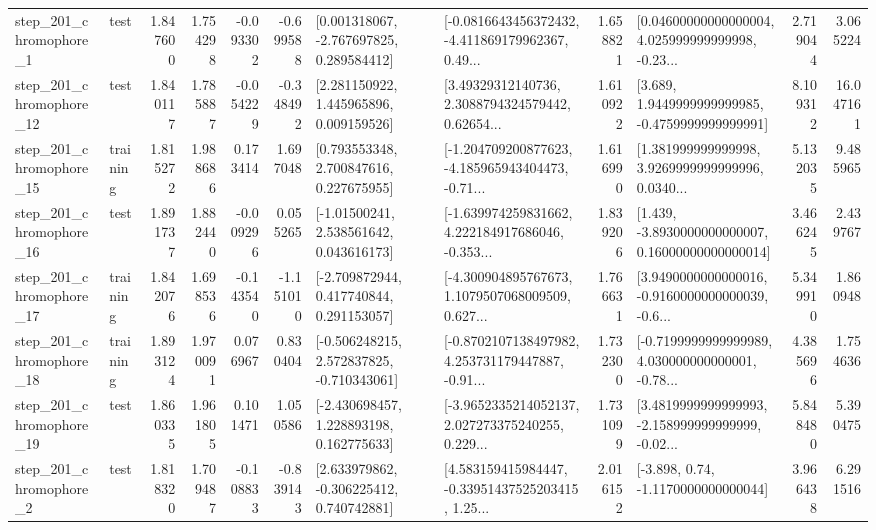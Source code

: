 \begin{tabular}{llrrrrllrlrr}
   step\_201\_chromophore\_1 &      test &      1.847600 &    1.754298 &     -0.093302 & -0.699588 &    [0.001318067, -2.767697825, 0.289584412] &  [-0.0816643456372432, -4.411869179962367, 0.49... &       1.658821 &  [0.04600000000000004, 4.025999999999998, -0.23... &            2.719044 &          3.065224 \\
  step\_201\_chromophore\_12 &      test &      1.840117 &    1.785887 &     -0.054229 & -0.348492 &     [2.281150922, 1.445965896, 0.009159526] &  [3.49329312140736, 2.3088794324579442, 0.62654... &       1.610922 &   [3.689, 1.9449999999999985, -0.4759999999999991] &            8.109312 &         16.047161 \\
  step\_201\_chromophore\_15 &  training &      1.815272 &    1.988686 &      0.173414 &  1.697048 &     [0.793553348, 2.700847616, 0.227675955] &  [-1.204709200877623, -4.185965943404473, -0.71... &       1.616990 &  [1.381999999999998, 3.9269999999999996, 0.0340... &            5.132035 &          9.485965 \\
  step\_201\_chromophore\_16 &      test &      1.891737 &    1.882440 &     -0.009296 &  0.055265 &     [-1.01500241, 2.538561642, 0.043616173] &  [-1.639974259831662, 4.222184917686046, -0.353... &       1.839206 &  [1.439, -3.8930000000000007, 0.16000000000000014] &            3.466245 &          2.439767 \\
  step\_201\_chromophore\_17 &  training &      1.842076 &    1.698536 &     -0.143540 & -1.151010 &    [-2.709872944, 0.417740844, 0.291153057] &  [-4.300904895767673, 1.1079507068009509, 0.627... &       1.766631 &  [3.9490000000000016, -0.9160000000000039, -0.6... &            5.349910 &          1.860948 \\
  step\_201\_chromophore\_18 &  training &      1.893124 &    1.970091 &      0.076967 &  0.830404 &   [-0.506248215, 2.572837825, -0.710343061] &  [-0.8702107138497982, 4.253731179447887, -0.91... &       1.732300 &  [-0.7199999999999989, 4.030000000000001, -0.78... &            4.385696 &          1.754636 \\
  step\_201\_chromophore\_19 &      test &      1.860335 &    1.961805 &      0.101471 &  1.050586 &    [-2.430698457, 1.228893198, 0.162775633] &  [-3.9652335214052137, 2.027273375240255, 0.229... &       1.731099 &  [3.4819999999999993, -2.158999999999999, -0.02... &            5.848480 &          5.390475 \\
   step\_201\_chromophore\_2 &      test &      1.818320 &    1.709487 &     -0.108833 & -0.839143 &    [2.633979862, -0.306225412, 0.740742881] &  [4.583159415984447, -0.33951437525203415, 1.25... &       2.016152 &                [-3.898, 0.74, -1.1170000000000044] &            3.966438 &          6.291516 \\

\end{tabular}
